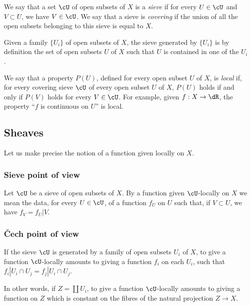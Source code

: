 We say that a set $\cU$ of open subsets of $X$ is a \emph{sieve} if for every
$U\in\cU$ and $V\subset U$, we have $V\in\cU$. We say that a sieve is
\emph{covering} if the union of all the open subsets belonging to this sieve is
equal to $X$.

Given a family $\{U_i\}$ of open subsets of $X$, the sieve generated by
$\{U_i\}$ is by definition the set of open subsets $U$ of $X$ such that $U$
is contained in one of the $U_i$.

We say that a property $P(U)$, defined for every open subset $U$ of $X$, is
\emph{local} if, for every covering sieve $\cU$ of every open subset $U$ of $X$,
$P(U)$ holds if and only if $P(V)$ holds for every $V\in \cU$. For
example, given $f:X\to \dR$, the property ``$f$ is continuous on $U$''
is local. 





\subsection{Sheaves}\label{I:1-2}

Let us make precise the notion of a function given locally on $X$.





\subsubsection{Sieve point of view}\label{I:1-2-1}

Let $\cU$ be a sieve of open subsets of $X$. By a function given
$\cU$-locally on $X$ we mean the data, for every $U\in \cU$, of a function $f_U$
on $U$ such that, if $V\subset U$, we have $f_V=f_U|V$. 





\subsubsection{\v Cech point of view}\label{I:1-2-2}

If the sieve $\cU$ is generated by a family of open subsets $U_i$ of $X$, to
give a function $\cU$-locally amounts to giving a function $f_i$
on each $U_i$, such that $f_i|{U_i\cap U_j} = f_j|{U_i\cap U_j}$.

In other words, if $Z=\coprod U_i$, to give a function $\cU$-locally
amounts to giving a function on $Z$ which is constant on the fibres of
the natural projection $Z\to X$. 





